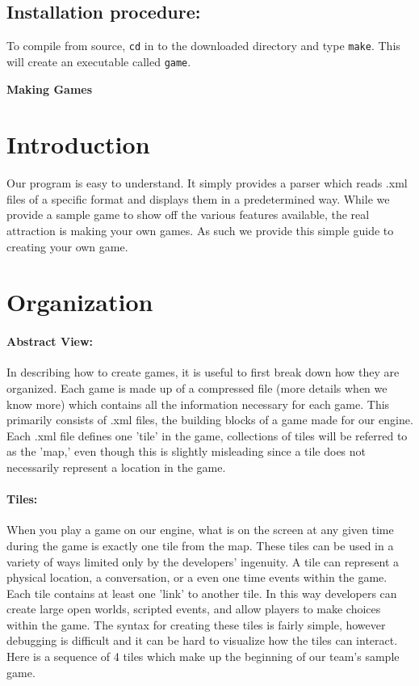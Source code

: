 \documentclass[11pt]{article}
\begin{document}
    
\subsection{Installation procedure:}
    \indent \indent To compile from source, \texttt{cd} in to the downloaded directory and type \texttt{make}.
    This will create an executable called \texttt{game}.
\\ 

\begin{center}\huge \bf Making Games
\end{center}

\section{Introduction}

Our program is easy to understand. It simply provides a parser which reads .xml files of a specific format and displays them in a predetermined way. While we provide a sample game to show off the various features available, the real attraction is making your own games. As such we provide this simple guide to creating your own game.


\section{Organization}

\paragraph{Abstract View:}

In describing how to create games, it is useful to first break down how they are organized. Each game is made up of a compressed file (more details when we know more) which contains all the information necessary for each game. This primarily consists of .xml files, the building blocks of a game made for our engine. Each .xml file defines one 'tile' in the game, collections of tiles will be referred to as the 'map,' even though this is slightly misleading since a tile does not necessarily represent a location in the game.

\paragraph{Tiles:}

When you play a game on our engine, what is on the screen at any given time during the game is exactly one tile from the map. These tiles can be used in a variety of ways limited only by the developers' ingenuity. A tile can represent a physical location, a conversation, or a even one time events within the game. Each tile contains at least one 'link' to another tile. In this way developers can create large open worlds, scripted events, and allow players to make choices within the game. The syntax for creating these tiles is fairly simple, however debugging is difficult and it can be hard to visualize how the tiles can interact. Here is a sequence of 4 tiles which make up the beginning of our team's sample game.
\end{document}
